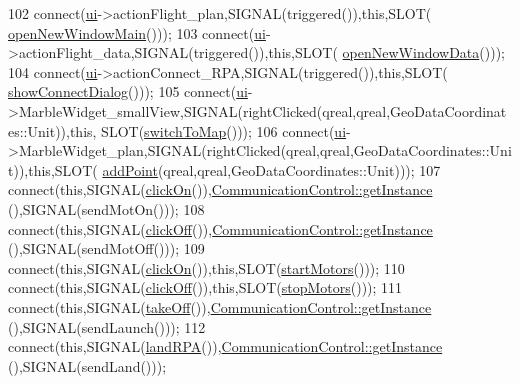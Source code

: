 \begin{DoxyCode}
102     connect(\hyperlink{a00008_a6dc041ef6a2ffb329928d2913e8344e6}{ui}->actionFlight\_plan,SIGNAL(triggered()),\textcolor{keyword}{this},SLOT(
      \hyperlink{a00008_a688b7983c0da36424d5b4d10a0c007f7}{openNewWindowMain}()));
103     connect(\hyperlink{a00008_a6dc041ef6a2ffb329928d2913e8344e6}{ui}->actionFlight\_data,SIGNAL(triggered()),\textcolor{keyword}{this},SLOT(
      \hyperlink{a00008_a7d0835d5762ca85bc460aeeabca018c7}{openNewWindowData}()));
104     connect(\hyperlink{a00008_a6dc041ef6a2ffb329928d2913e8344e6}{ui}->actionConnect\_RPA,SIGNAL(triggered()),\textcolor{keyword}{this},SLOT(
      \hyperlink{a00008_a13c530c7730eed3b343371e9212d34dc}{showConnectDialog}()));
105     connect(\hyperlink{a00008_a6dc041ef6a2ffb329928d2913e8344e6}{ui}->MarbleWidget\_smallView,SIGNAL(rightClicked(qreal,qreal,GeoDataCoordinates::Unit)),\textcolor{keyword}{this},
      SLOT(\hyperlink{a00008_ab8446a0b12406c07562af271392ab19b}{switchToMap}()));
106     connect(\hyperlink{a00008_a6dc041ef6a2ffb329928d2913e8344e6}{ui}->MarbleWidget\_plan,SIGNAL(rightClicked(qreal,qreal,GeoDataCoordinates::Unit)),\textcolor{keyword}{this},SLOT(
      \hyperlink{a00008_a070a5570eaeac36ef13715ca18be3ec9}{addPoint}(qreal,qreal,GeoDataCoordinates::Unit)));
107     connect(\textcolor{keyword}{this},SIGNAL(\hyperlink{a00008_a42ef85a38e0a61330cd585794bf3cfaf}{clickOn}()),\hyperlink{a00001_afebd43c1f2afd7ec0eb35f99e50f0964}{CommunicationControl::getInstance}
      (),SIGNAL(sendMotOn()));
108     connect(\textcolor{keyword}{this},SIGNAL(\hyperlink{a00008_ac34fbec63046ddaebc974f824ecd2fdc}{clickOff}()),\hyperlink{a00001_afebd43c1f2afd7ec0eb35f99e50f0964}{CommunicationControl::getInstance}
      (),SIGNAL(sendMotOff()));
109     connect(\textcolor{keyword}{this},SIGNAL(\hyperlink{a00008_a42ef85a38e0a61330cd585794bf3cfaf}{clickOn}()),\textcolor{keyword}{this},SLOT(\hyperlink{a00008_abadb8f70e876fb2365f2efbfb7993d57}{startMotors}()));
110     connect(\textcolor{keyword}{this},SIGNAL(\hyperlink{a00008_ac34fbec63046ddaebc974f824ecd2fdc}{clickOff}()),\textcolor{keyword}{this},SLOT(\hyperlink{a00008_a5260da8b51f5d97f6cf2a9ba11d1aee1}{stopMotors}()));
111     connect(\textcolor{keyword}{this},SIGNAL(\hyperlink{a00008_a0f430392f18caaad506a00497cee44e1}{takeOff}()),\hyperlink{a00001_afebd43c1f2afd7ec0eb35f99e50f0964}{CommunicationControl::getInstance}
      (),SIGNAL(sendLaunch()));
112     connect(\textcolor{keyword}{this},SIGNAL(\hyperlink{a00008_ad24d2f849168e68c2a9534a017adbea2}{landRPA}()),\hyperlink{a00001_afebd43c1f2afd7ec0eb35f99e50f0964}{CommunicationControl::getInstance}
      (),SIGNAL(sendLand()));

\end{DoxyCode}
